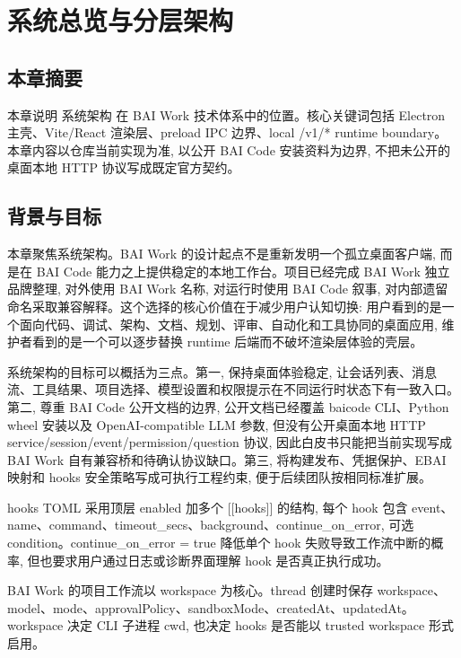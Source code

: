 \chapter{系统总览与分层架构}
\section{本章摘要}
本章说明 系统架构 在 BAI Work 技术体系中的位置。核心关键词包括 Electron 主壳、Vite/React 渲染层、preload IPC 边界、local /v1/* runtime boundary。本章内容以仓库当前实现为准, 以公开 BAI Code 安装资料为边界, 不把未公开的桌面本地 HTTP 协议写成既定官方契约。

\section{背景与目标}
本章聚焦系统架构。BAI Work 的设计起点不是重新发明一个孤立桌面客户端, 而是在 BAI Code 能力之上提供稳定的本地工作台。项目已经完成 BAI Work 独立品牌整理, 对外使用 BAI Work 名称, 对运行时使用 BAI Code 叙事, 对内部遗留命名采取兼容解释。这个选择的核心价值在于减少用户认知切换: 用户看到的是一个面向代码、调试、架构、文档、规划、评审、自动化和工具协同的桌面应用, 维护者看到的是一个可以逐步替换 runtime 后端而不破坏渲染层体验的壳层。

系统架构的目标可以概括为三点。第一, 保持桌面体验稳定, 让会话列表、消息流、工具结果、项目选择、模型设置和权限提示在不同运行时状态下有一致入口。第二, 尊重 BAI Code 公开文档的边界, 公开文档已经覆盖 baicode CLI、Python wheel 安装以及 OpenAI-compatible LLM 参数, 但没有公开桌面本地 HTTP service/session/event/permission/question 协议, 因此白皮书只能把当前实现写成 BAI Work 自有兼容桥和待确认协议缺口。第三, 将构建发布、凭据保护、EBAI 映射和 hooks 安全策略写成可执行工程约束, 便于后续团队按相同标准扩展。

hooks TOML 采用顶层 enabled 加多个 [[hooks]] 的结构, 每个 hook 包含 event、name、command、timeout\_secs、background、continue\_on\_error, 可选 condition。continue\_on\_error = true 降低单个 hook 失败导致工作流中断的概率, 但也要求用户通过日志或诊断界面理解 hook 是否真正执行成功。

BAI Work 的项目工作流以 workspace 为核心。thread 创建时保存 workspace、model、mode、approvalPolicy、sandboxMode、createdAt、updatedAt。workspace 决定 CLI 子进程 cwd, 也决定 hooks 是否能以 trusted workspace 形式启用。

